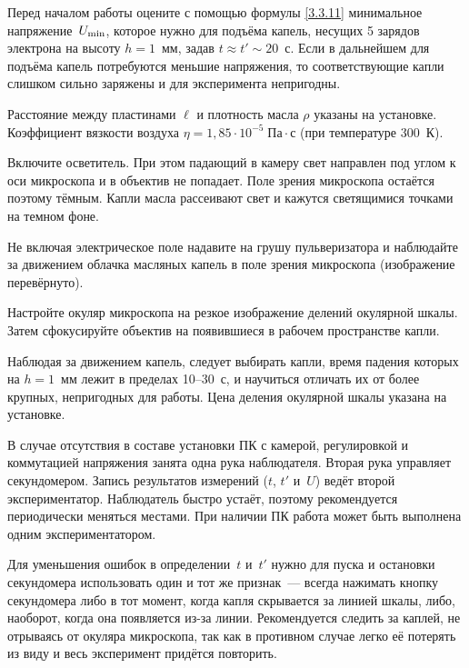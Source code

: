 \begin{lab:task}

    
\item Перед началом работы оцените с помощью формулы \eqref{3.3.11} 
минимальное напряжение~$U_{\rm min}$, которое нужно для подъёма капель, 
несущих 5 зарядов электрона на высоту $h=1$~мм, задав $t\approx t' \sim 20$~с. 
Если в дальнейшем для подъёма капель потребуются меньшие напряжения, 
то соответствующие капли слишком сильно заряжены и для эксперимента непригодны.

Расстояние между пластинами $\ell$ и плотность масла $\rho$ указаны на установке.
Коэффициент вязкости воздуха $\eta=1,85\cdot 10^{-5}\;\text{Па}\cdot \text{с}$
(при температуре 300~К).

\item Включите осветитель. При этом падающий в камеру свет направлен под углом к
оси микроскопа и в объектив не попадает. Поле зрения микроскопа остаётся поэтому
тёмным. Капли масла рассеивают свет и кажутся светящимися точками на темном
фоне.

Не включая электрическое поле  надавите на грушу
пульверизатора  и наблюдайте за движением облачка масляных капель в поле зрения
микроскопа (изображение перевёрнуто).

\item Настройте окуляр микроскопа на резкое изображение делений окулярной шкалы.
Затем сфокусируйте объектив на появившиеся в рабочем пространстве капли.

\item Наблюдая за движением капель, следует выбирать капли, время падения
которых на $h=1$~мм лежит в пределах 10--30~с, и научиться отличать 
их от более крупных, непригодных для работы. Цена деления окулярной шкалы 
указана на установке.

В случае отсутствия в составе установки ПК с камерой, регулировкой и коммутацией
напряжения занята одна рука наблюдателя. Вторая рука управляет секундомером.
Запись результатов измерений ($t$, $t'$ и~$U$) ведёт второй экспериментатор.
Наблюдатель быстро устаёт, поэтому рекомендуется периодически меняться местами.
При наличии ПК работа может быть выполнена одним экспериментатором.

Для уменьшения ошибок в определении~$t$ и~$t'$ нужно для пуска и остановки
секундомера использовать один и тот же признак~--- всегда нажимать 
кнопку секундомера либо в тот момент, когда капля скрывается за линией шкалы, либо,
наоборот, когда она появляется из-за линии. Рекомендуется следить за каплей, не
отрываясь от окуляра микроскопа, так как в противном случае легко её потерять из
виду и весь эксперимент придётся повторить.


\end{lab:task}
